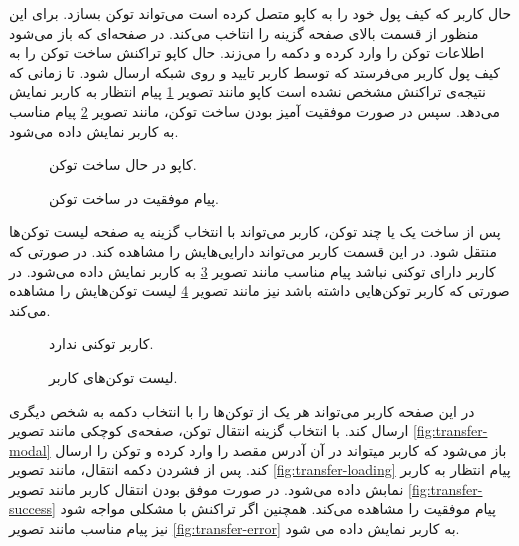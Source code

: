 حال کاربر که کیف پول خود را به کاپو متصل کرده است می‌تواند توکن بسازد.
برای این منظور از قسمت بالای صفحه گزینه
را انتاخب می‌کند.
در صفحه‌ای که باز می‌شود اطلاعات توکن را وارد کرده و دکمه
را می‌زند.
حال کاپو تراکنش ساخت توکن را به کیف پول کاربر می‌فرستد که توسط کاربر تایید و روی شبکه ارسال شود.
تا زمانی که نتیجه‌ی تراکنش مشخص نشده است کاپو مانند تصویر
\ref{fig:mint-loading}
پیام انتظار به کاربر نمایش می‌دهد.
سپس در صورت موفقیت آمیز بودن ساخت توکن، مانند تصویر
\ref{fig:mint-success}
پیام مناسب به کاربر نمایش داده می‌شود.

\begin{figure}
\centerline{}
\caption{کاپو در حال ساخت توکن.}
\label{fig:mint-loading}
\end{figure}

\begin{figure}
\centerline{}
\caption{پیام موفقیت در ساخت توکن.}
\label{fig:mint-success}
\end{figure}

پس از ساخت یک یا چند توکن، کاربر می‌تواند با انتخاب گزینه
یه صفحه لیست توکن‌ها منتقل شود.
در این قسمت کاربر می‌تواند دارایی‌هایش را مشاهده کند.
در صورتی که کاربر دارای توکنی نباشد پیام مناسب مانند تصویر
\ref{fig:no-tokens-yet}
به کاربر نمایش داده می‌شود.
در صورتی که کاربر توکن‌هایی داشته باشد نیز مانند تصویر
\ref{fig:tokens-list}
لیست توکن‌هایش را مشاهده می‌کند.


\begin{figure}
\centerline{}
\caption{کاربر توکنی ندارد.}
\label{fig:no-tokens-yet}
\end{figure}

\begin{figure}
\centerline{}
\caption{لیست توکن‌های کاربر.}
\label{fig:tokens-list}
\end{figure}

در این صفحه کاربر می‌تواند هر یک از توکن‌ها را با انتخاب دکمه
به شخص دیگری ارسال کند.
با انتخاب گزینه انتقال توکن،
صفحه‌ی کوچکی مانند تصویر
\ref{fig:transfer-modal}
باز می‌شود که کاربر میتواند در آن آدرس مقصد را وارد کرده و توکن را ارسال کند.
پس از فشردن دکمه انتقال، مانند تصویر
\ref{fig:transfer-loading}
پیام انتظار به کاربر نمابش داده می‌شود.
در صورت موفق بودن انتقال کاربر مانند تصویر
\ref{fig:transfer-success}
پیام موفقیت را مشاهده می‌کند.
همچنین اگر تراکنش با مشکلی مواجه شود نیز پیام مناسب مانند تصویر
\ref{fig:transfer-error}
به کاربر نمایش داده می شود.

